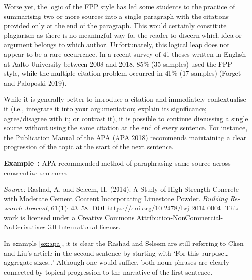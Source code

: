 \documentclass[english, 12pt, a4paper, biz, utf8, a-2b, online]{aaltothesis}
\begin{document}
Worse yet, the logic of the FPP style has led some students to the practice of 
summarising two or more sources into a single paragraph with the citations 
provided only at the end of the paragraph. This would certainly constitute 
plagiarism as there is no meaningful way for the reader to discern which idea or
argument belongs to which author. Unfortunately, this logical leap does not 
appear to be a rare occurrence. In a recent survey of 41 theses written in 
English at Aalto University between 2008 and 2018, 85\% (35 samples) used the 
FPP style, while the multiple citation problem occurred in 41\% (17 samples) 
(Forget and Paloposki 2019).

While it is generally better to introduce a citation and immediately 
contextualise it (i.e., integrate it into your argumentation; explain its 
significance; agree/disagree with it; or contrast it), it is possible to 
continue discussing a single source without using the same citation at the end 
of every sentence. For instance, the Publication Manual of the APA (APA 2018) 
recommends maintaining a clear progression of the topic at the start of the next
sentence.

\vspace{1em}
\noindent
{}
\textsf{\textbf{Example~\theexample:}} \label{ex:apa}APA-recommended method of 
paraphrasing same source across consecutive sentences 

\vspace{1ex}
\noindent
{}

\vspace{1ex}
\noindent
\textit{Source:} Rashad, A. and Seleem, H. (2014). A Study of High Strength 
Concrete with Moderate Cement Content Incorporating Limestone Powder. 
\textit{Building Re-search Journal}, 61(1): 43--58. 
DOI \url{https://doi.org/10.2478/brj-2014-0004}. 
This work is licensed under a Creative Commons 
Attribution-NonCommercial-NoDerivatives 3.0 International license.

\vspace{1em}
In example \ref{ex:apa}, it is clear the Rashad and Seleem are still referring 
to Chen and Liu’s article in the second sentence by starting with ‘For this 
purpose\ldots aggregate sizes\ldots’ Although one would suffice, both noun 
phrases are clearly connected by topical progression to the narrative of the 
first sentence.
\end{document}
